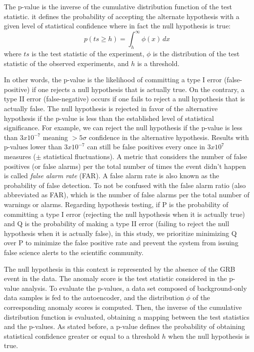 \begin{definition}
\label{def:pvalues} 
The p-value is the inverse of the cumulative distribution function of the test statistic. it defines the probability of accepting the alternate hypothesis with a given level of statistical confidence where in fact the null hypothesis is true:
$$ p(ts \geq h) = \int_{h}^{\infty} \phi(x) \,dx $$
where $ts$ is the test statistic of the experiment, $\phi$ is the distribution of the test statistic of the observed experiments, and $h$ is a threshold.
\end{definition}
In other words, the p-value is the likelihood of committing a type I error (false-positive) if one rejects a null hypothesis that is actually true. On the contrary, a type II error (false-negative) occurs if one fails to reject a null hypothesis that is actually false.
The null hypothesis is rejected in favor of the alternative hypothesis if the p-value is less than the established level of statistical significance. 
For example, we can reject the null hypothesis if the p-value is less than $3x10^{-7}$ meaning $> 5\sigma$ confidence in the alternative hypothesis. 
Results with p-values lower than $3x10^{-7}$ can still be false positives every once in $3x10^7$ measures ($\pm$ statistical fluctuations). A metric that considers the number of false positives (or false alarms) per the total number of times the event didn't happen is called \textit{false alarm rate} (FAR). A false alarm rate is also known as the probability of false detection. To not be confused with the false alarm ratio (also abbreviated as FAR), which is the number of false alarms per the total number of warnings or alarms. Regarding hypothesis testing, if P is the probability of committing a type I error (rejecting the null hypothesis when it is actually true) and Q is the probability of making a type II error (failing to reject the null hypothesis when it is actually false), in this study, we prioritize minimizing Q over P to minimize the false positive rate and prevent the system from issuing false science alerts to the scientific community. 

The null hypothesis in this context is represented by the absence of the GRB event in the data. The anomaly score is the test statistic considered in the p-value analysis. To evaluate the p-values, a data set composed of background-only data samples is fed to the autoencoder, and the distribution $\phi$ of the corresponding anomaly scores is computed. Then, the inverse of the cumulative distribution function is evaluated, obtaining a mapping between the test statistics and the p-values. As stated before, a p-value defines the probability of obtaining statistical confidence greater or equal to a threshold $h$ when the null hypothesis is true. 

